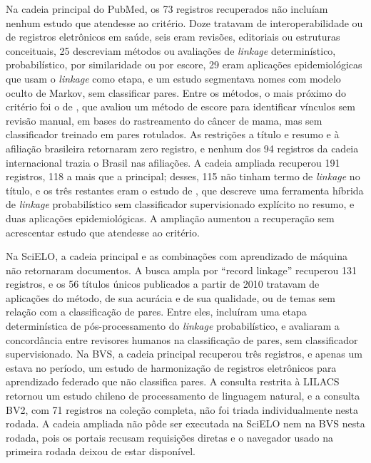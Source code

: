 Na cadeia principal do PubMed, os 73 registros recuperados não incluíam nenhum estudo que atendesse ao critério. Doze tratavam de interoperabilidade ou de registros eletrônicos em saúde, seis eram revisões, editoriais ou estruturas conceituais, 25 descreviam métodos ou avaliações de \textit{linkage} determinístico, probabilístico, por similaridade ou por escore, 29 eram aplicações epidemiológicas que usam o \textit{linkage} como etapa, e um estudo segmentava nomes com modelo oculto de Markov, sem classificar pares. Entre os métodos, o mais próximo do critério foi o de , que avaliou um método de escore para identificar vínculos sem revisão manual, em bases do rastreamento do câncer de mama, mas sem classificador treinado em pares rotulados. As restrições a título e resumo e à afiliação brasileira retornaram zero registro, e nenhum dos 94 registros da cadeia internacional trazia o Brasil nas afiliações. A cadeia ampliada recuperou 191 registros, 118 a mais que a principal; desses, 115 não tinham termo de \textit{linkage} no título, e os três restantes eram o estudo de , que descreve uma ferramenta híbrida de \textit{linkage} probabilístico sem classificador supervisionado explícito no resumo, e duas aplicações epidemiológicas. A ampliação aumentou a recuperação sem acrescentar estudo que atendesse ao critério.

Na SciELO, a cadeia principal e as combinações com aprendizado de máquina não retornaram documentos. A busca ampla por ``record linkage'' recuperou 131 registros, e os 56 títulos únicos publicados a partir de 2010 tratavam de aplicações do método, de sua acurácia e de sua qualidade, ou de temas sem relação com a classificação de pares. Entre eles,  incluíram uma etapa determinística de pós-processamento do \textit{linkage} probabilístico, e  avaliaram a concordância entre revisores humanos na classificação de pares, sem classificador supervisionado. Na BVS, a cadeia principal recuperou três registros, e apenas um estava no período, um estudo de harmonização de registros eletrônicos para aprendizado federado que não classifica pares. A consulta restrita à LILACS retornou um estudo chileno de processamento de linguagem natural, e a consulta BV2, com 71 registros na coleção completa, não foi triada individualmente nesta rodada. A cadeia ampliada não pôde ser executada na SciELO nem na BVS nesta rodada, pois os portais recusam requisições diretas e o navegador usado na primeira rodada deixou de estar disponível.

